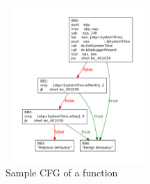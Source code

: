 \begin{figure}[!h]
\begin{center}\vspace{-1mm}
\includegraphics[height=6cm, width=5.5cm]{srj-figures/srj-toy_malware_cfg.pdf} \vspace{-1mm}
\caption{Sample CFG of a function}
\label{fig:example-cfg} \vspace{-1mm}
\end{center}
\end{figure}

